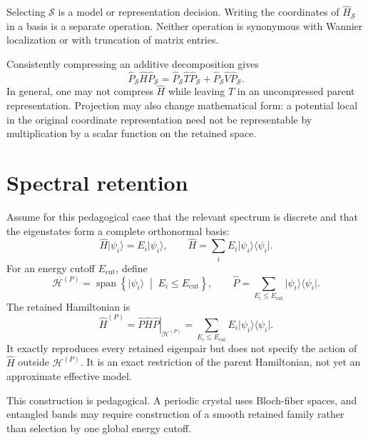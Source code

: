 Selecting \(\mathcal S\) is a model or representation decision. Writing the
coordinates of \(\widehat H_{\mathcal S}\) in a basis is a separate operation.
Neither operation is synonymous with Wannier localization or with truncation of
matrix entries.

Consistently compressing an additive decomposition gives
\begin{equation}
  \hat P_{\mathcal S}\hat H\hat P_{\mathcal S}
  =\hat P_{\mathcal S}\hat T\hat P_{\mathcal S}
  +\hat P_{\mathcal S}\hat V\hat P_{\mathcal S}.
\end{equation}
In general, one may not compress \(\hat H\) while leaving \(\hat T\) in an
uncompressed parent representation. Projection may also change mathematical
form: a potential local in the original coordinate representation need not be
representable by multiplication by a scalar function on the retained space.

\section{Spectral retention}

Assume for this pedagogical case that the relevant spectrum is discrete and
that the eigenstates form a complete orthonormal basis:
\begin{equation}
  \hat H\lvert\psi_i\rangle=E_i\lvert\psi_i\rangle,
  \qquad
  \hat H=\sum_i E_i\lvert\psi_i\rangle\langle\psi_i\rvert.
\end{equation}
For an energy cutoff \(E_{\mathrm{cut}}\), define
\begin{equation}
  \mathcal H^{(P)}
  =\operatorname{span}
   \left\{\lvert\psi_i\rangle\;\middle|\;E_i\leq E_{\mathrm{cut}}\right\},
  \qquad
  \hat P=\sum_{E_i\leq E_{\mathrm{cut}}}
  \lvert\psi_i\rangle\langle\psi_i\rvert.
\end{equation}
The retained Hamiltonian is
\begin{equation}
  \hat H^{(P)}
  =\left.\hat P\hat H\hat P\right|_{\mathcal H^{(P)}}
  =\sum_{E_i\leq E_{\mathrm{cut}}}
  E_i\lvert\psi_i\rangle\langle\psi_i\rvert.
\end{equation}
It exactly reproduces every retained eigenpair but does not specify the action
of \(\hat H\) outside \(\mathcal H^{(P)}\). It is an exact restriction of the
parent Hamiltonian, not yet an approximate effective model.

This construction is pedagogical. A periodic crystal uses Bloch-fiber spaces,
and entangled bands may require construction of a smooth retained family rather
than selection by one global energy cutoff.

